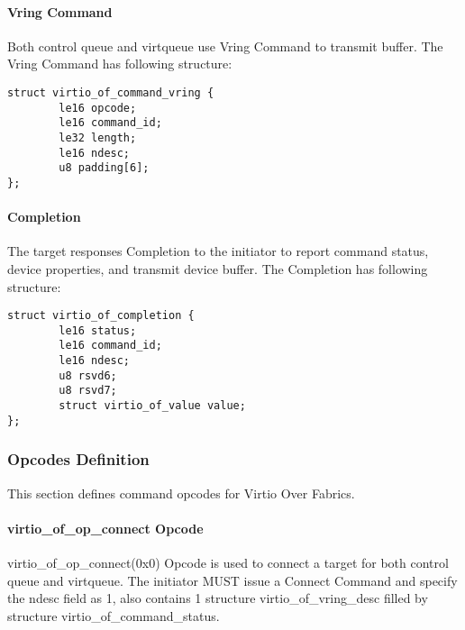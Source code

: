 \paragraph{Vring Command}\label{sec:Virtio Transport Options / Virtio Over Fabrics / Transmition Protocol / Commands Definition / Vring Command}

Both control queue and virtqueue use Vring Command to transmit buffer. The Vring Command has following structure:

\begin{lstlisting}
struct virtio_of_command_vring {
        le16 opcode;
        le16 command_id;
        le32 length;
        le16 ndesc;
        u8 padding[6];
};
\end{lstlisting}

\paragraph{Completion}\label{sec:Virtio Transport Options / Virtio Over Fabrics / Transmition Protocol / Commands Definition / Completion}

The target responses Completion to the initiator to report command status, device properties, and transmit device buffer. The Completion has following structure:

\begin{lstlisting}
struct virtio_of_completion {
        le16 status;
        le16 command_id;
        le16 ndesc;
        u8 rsvd6;
        u8 rsvd7;
        struct virtio_of_value value;
};
\end{lstlisting}

\subsubsection{Opcodes Definition}\label{sec:Virtio Transport Options / Virtio Over Fabrics / Transmition Protocol / Opcodes Definition}
This section defines command opcodes for Virtio Over Fabrics.

\paragraph{virtio_of_op_connect Opcode}\label{sec:Virtio Transport Options / Virtio Over Fabrics / Transmition Protocol / Opcodes Definition / virtio_of_op_connect Opcode}

virtio_of_op_connect(0x0) Opcode is used to connect a target for both control queue and virtqueue. The initiator MUST issue a Connect Command and specify the ndesc field as 1, also contains 1 structure virtio_of_vring_desc filled by structure virtio_of_command_status.

